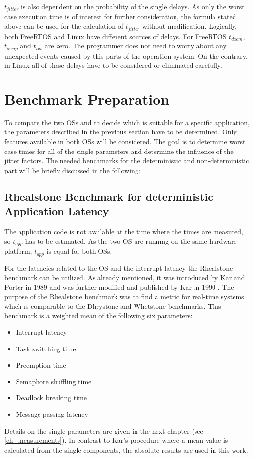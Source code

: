 $ t_{jitter} $ is also dependent on the probability of the single delays.
As only the worst case execution time is of interest for further consideration, the formula stated above can be used for the calculation of $ t_{jitter} $ without modification.    
Logically, both FreeRTOS and Linux have different sources of delays. 
For FreeRTOS $ t_{daem} $, $ t_{swap} $ and $ t_{int} $ are zero. 
The programmer does not need to worry about any unexpected events caused by this parts of the operation system.
On the contrary, in Linux all of these delays have to be considered or eliminated carefully.

\section{Benchmark Preparation}
To compare the two \acp{OS} and to decide which is suitable for a specific application, the parameters described in the previous section have to be determined.
Only features available in both \acp{OS} will be considered.
The goal is to determine worst case times for all of the single parameters and determine the influence of the jitter factors.
The needed benchmarks for the deterministic and non-deterministic part will be briefly discussed in the following:
\subsection{Rhealstone Benchmark for deterministic Application Latency} \label{ss_rhealstone_benchmark_for_deterministic_application_latency}
The application code is not available at the time where the times are measured, so $ t_{app} $ has to be estimated. As the two \ac{OS} are running on the same hardware platform, $ t_{app} $ is equal for both \acp{OS}.
\par
For the latencies related to the \ac{OS} and the interrupt latency the Rhealstone benchmark can be utilized. 
As already mentioned, it was introduced by Kar and Porter in 1989 \cite{kar:artbp} and was further modified and published by Kar in 1990 \cite{kar:itrb}.
The purpose of the Rhealstone benchmark was to find a metric for real-time systems which is comparable to the Dhrystone \cite{weicker:dasspb} and Whetstone \cite{wichmann:asb} benchmarks.
This benchmark is a weighted mean of the following six parameters:
\begin{itemize}
	\item Interrupt latency
	\item Task switching time
	\item Preemption time
	\item Semaphore shuffling time
	\item Deadlock breaking time
	\item Message passing latency
\end{itemize}
Details on the single parameters are given in the next chapter (see \ref{ch_measurements}).
In contrast to Kar's procedure where a mean value is calculated from the single components, the absolute results are used in this work. 

